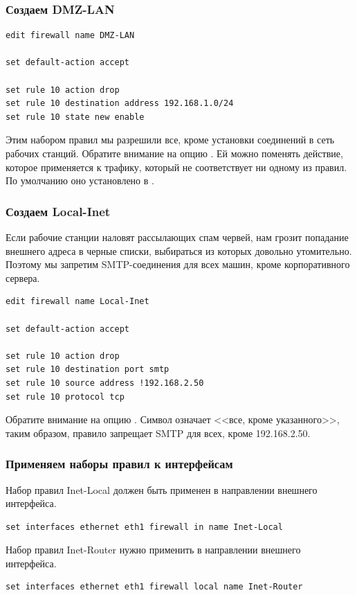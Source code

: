 \documentclass[a4paper,12pt, twoside, russian]{report}
\begin{document}
\subsubsection{Создаем DMZ-LAN}
\begin{verbatim}
edit firewall name DMZ-LAN

set default-action accept

set rule 10 action drop
set rule 10 destination address 192.168.1.0/24
set rule 10 state new enable
\end{verbatim}

Этим набором правил мы разрешили все, кроме установки соединений в сеть рабочих станций. Обратите внимание на
опцию . Ей можно поменять действие, которое применяется к трафику, который не соответствует ни
одному из правил. По умолчанию оно установлено в .

\subsubsection{Создаем Local-Inet}
Если рабочие станции наловят рассылающих спам червей, нам грозит попадание внешнего адреса в черные списки,
выбираться из которых довольно утомительно. Поэтому мы запретим SMTP-соединения для всех машин, кроме
корпоративного сервера.

\begin{verbatim}
edit firewall name Local-Inet

set default-action accept

set rule 10 action drop
set rule 10 destination port smtp
set rule 10 source address !192.168.2.50
set rule 10 protocol tcp
\end{verbatim}

Обратите внимание на опцию . Символ \command{!} означает <<все, кроме указанного>>,
таким образом, правило запрещает SMTP для всех, кроме 192.168.2.50.

\subsubsection{Применяем наборы правил к интерфейсам}
Набор правил Inet-Local должен быть применен в направлении  внешнего интерфейса.
\begin{verbatim}
set interfaces ethernet eth1 firewall in name Inet-Local
\end{verbatim}

Набор правил Inet-Router нужно применить в направлении  внешнего интерфейса.
\begin{verbatim}
set interfaces ethernet eth1 firewall local name Inet-Router
\end{verbatim}
\end{document}
